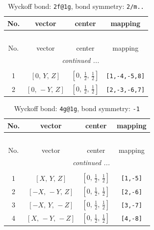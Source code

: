 \documentclass[fleqn,8pt]{jsarticle}
\begin{document}
\begin{longtable}{cccc}
\caption{Wyckoff bond: {\tt 2f@1g}, bond symmetry: {\tt 2/m..}}
 \\
 \hline \hline
No. & vector & center & mapping \\ \hline \endfirsthead

\multicolumn{3}{l}{\tablename\ \thetable{}} \\
 \hline \hline
No. & vector & center & mapping \\ \hline \endhead

 \hline \hline
\multicolumn{3}{r}{\footnotesize\it continued ...} \\ \endfoot

 \hline \hline
\multicolumn{3}{r}{} \\ \endlastfoot

1 & $\left[ 0,\, Y,\, Z \right]$ & $\left[ 0,\, \frac{1}{2},\, \frac{1}{2} \right]$ & {\tt [1,-4,-5,8]} \\ \hline
2 & $\left[ 0,\, - Y,\, Z \right]$ & $\left[ 0,\, \frac{1}{2},\, \frac{1}{2} \right]$ & {\tt [2,-3,-6,7]} \\
\end{longtable}
\renewcommand{\arraystretch}{1.2}
\begin{longtable}{cccc}
\caption{Wyckoff bond: {\tt 4g@1g}, bond symmetry: {\tt -1}}
 \\
 \hline \hline
No. & vector & center & mapping \\ \hline \endfirsthead

\multicolumn{3}{l}{\tablename\ \thetable{}} \\
 \hline \hline
No. & vector & center & mapping \\ \hline \endhead

 \hline \hline
\multicolumn{3}{r}{\footnotesize\it continued ...} \\ \endfoot

 \hline \hline
\multicolumn{3}{r}{} \\ \endlastfoot

1 & $\left[ X,\, Y,\, Z \right]$ & $\left[ 0,\, \frac{1}{2},\, \frac{1}{2} \right]$ & {\tt [1,-5]} \\ \hline
2 & $\left[ - X,\, - Y,\, Z \right]$ & $\left[ 0,\, \frac{1}{2},\, \frac{1}{2} \right]$ & {\tt [2,-6]} \\ \hline
3 & $\left[ - X,\, Y,\, - Z \right]$ & $\left[ 0,\, \frac{1}{2},\, \frac{1}{2} \right]$ & {\tt [3,-7]} \\ \hline
4 & $\left[ X,\, - Y,\, - Z \right]$ & $\left[ 0,\, \frac{1}{2},\, \frac{1}{2} \right]$ & {\tt [4,-8]} \\
\end{longtable}
\end{document}
